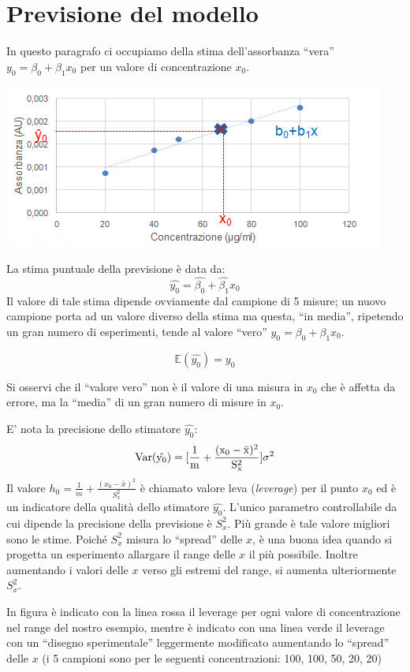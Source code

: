 \documentclass[
  11pt,
]{book}
\begin{document}
\hypertarget{previsione-del-modello}{%
\section{Previsione del modello}\label{previsione-del-modello}}

In questo paragrafo ci occupiamo della stima dell'assorbanza ``vera'' \(y_0=\beta_0+\beta_1x_0\) per un valore di concentrazione \(x_0\).

\begin{center}\includegraphics[width=0.5\linewidth]{Immagini/Regressione/08_prev} \end{center}

La stima puntuale della previsione è data da:
\[
\hat{y_0}=\hat{\beta_0}+\hat{\beta_1}x_0
\]
Il valore di tale stima dipende ovviamente dal campione di 5 misure; un nuovo campione porta ad un valore diverso della stima ma questa, ``in media'', ripetendo un gran numero di esperimenti, tende al valore ``vero'' \(y_0=\beta_0+\beta_1x_0\).

\[
\mathbb{E}(\hat{y_0})=y_0
\]

Si osservi che il ``valore vero'' non è il valore di una misura in \(x_0\) che è affetta da errore, ma la ``media'' di un gran numero di misure in \(x_0\).

E' nota la precisione dello stimatore \(\hat{y_0}\):
\[
\rm{Var}(\hat{y_0})=[\frac{1}{m}+\frac{(x_0-\bar{x})^2}{S^2_{x}}]\sigma^2
\]
Il valore \(h_0=\frac{1}{m}+\frac{(x_0-\bar{x})^2}{S^2_{x}}\) è chiamato valore leva (\emph{leverage}) per il punto \(x_0\) ed è un indicatore della qualità dello stimatore \(\hat{y_0}\).
L'unico parametro controllabile da cui dipende la precisione della previsione è \(S^2_{x}\). Più grande è tale valore migliori sono le stime.
Poiché \(S^2_{x}\) misura lo ``spread'' delle \(x\), è una buona idea quando si progetta un esperimento allargare il range delle \(x\) il più possibile. Inoltre aumentando i valori delle \(x\) verso gli estremi del range, si aumenta ulteriormente \(S^2_{x}\).

In figura è indicato con la linea rossa il leverage per ogni valore di concentrazione nel range del nostro esempio, mentre è indicato con una linea verde il leverage con un ``disegno sperimentale'' leggermente modificato aumentando lo ``spread'' delle \(x\) (i 5 campioni sono per le seguenti concentrazioni: 100, 100, 50, 20, 20)
\end{document}
